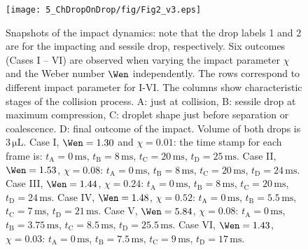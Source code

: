 \begin{figure}
	\centering
	\texttt{[image: 5\_ChDropOnDrop/fig/Fig2\_v3.eps]}
	\caption{Snapshots of the impact dynamics: note that the drop labels 1 and 2 are for the impacting and sessile drop, respectively. Six outcomes (Cases I – VI) are observed when varying the impact parameter $\chi$ and the Weber number $\Wen$ independently. The rows correspond to different impact parameter for I-VI. The columns show characteristic stages of the collision process. A: just at collision, B: sessile drop at maximum compression, C: droplet shape just before separation or coalescence. D: final outcome of the impact. Volume of both drops is $3\,\si{\micro\liter}$. Case I, $\Wen = 1.30$ and $\chi = 0.01$: the time stamp for each frame is: $t_{\text{A}} = 0\,\si{\milli\second}$, $t_{\text{B}} = 8\,\si{\milli\second}$, $t_{\text{C}} = 20\,\si{\milli\second}$, $t_{\text{D}} = 25\,\si{\milli\second}$. Case II, $\Wen = 1.53$, $\chi = 0.08$: $t_{\text{A}} = 0\,\si{\milli\second}$, $t_{\text{B}} = 8\,\si{\milli\second}$, $t_{\text{C}} =20\,\si{\milli\second}$, $t_{\text{D}} = 24\,\si{\milli\second}$.  Case III, $\Wen = 1.44$, $\chi = 0.24$: $t_{\text{A}} = 0\,\si{\milli\second}$, $t_{\text{B}} = 8\,\si{\milli\second}$, $t_{\text{C}} = 20\,\si{\milli\second}$, $t_{\text{D}} = 24\,\si{\milli\second}$. Case IV, $\Wen = 1.48$, $\chi = 0.52$: $t_{\text{A}} = 0\,\si{\milli\second}$, $t_{\text{B}} = 5.5\,\si{\milli\second}$, $t_{\text{C}} = 7\,\si{\milli\second}$, $t_{\text{D}} = 21\,\si{\milli\second}$. Case V, $\Wen = 5.84$, $\chi = 0.08$: $t_{\text{A}} = 0\,\si{\milli\second}$, $t_{\text{B}} = 3.75\,\si{\milli\second}$, $t_{\text{C}} = 8.5\,\si{\milli\second}$, $t_{\text{D}} = 25.5\,\si{\milli\second}$. Case VI, $\Wen = 1.43$, $\chi = 0.03$: $t_{\text{A}} = 0\,\si{\milli\second}$, $t_{\text{B}} = 7.5\,\si{\milli\second}$, $t_{\text{C}} = 9\,\si{\milli\second}$, $t_{\text{D}} = 17\,\si{\milli\second}$.}
	\label{ChDoD:fig2}
\end{figure}

